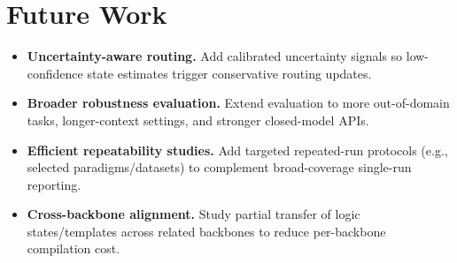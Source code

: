 \section{Future Work}
\label{app:future}

\begin{itemize}[leftmargin=1.6em]
    \item \textbf{Uncertainty-aware routing.} Add calibrated uncertainty signals so low-confidence state estimates trigger conservative routing updates.
    \item \textbf{Broader robustness evaluation.} Extend evaluation to more out-of-domain tasks, longer-context settings, and stronger closed-model APIs.
    \item \textbf{Efficient repeatability studies.} Add targeted repeated-run protocols (e.g., selected paradigms/datasets) to complement broad-coverage single-run reporting.
    \item \textbf{Cross-backbone alignment.} Study partial transfer of logic states/templates across related backbones to reduce per-backbone compilation cost.
\end{itemize}

